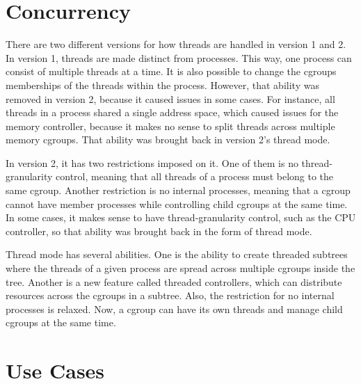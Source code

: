\documentclass[12pt, dvipsnames, a4paper]{article}
\begin{document}
\section{Concurrency}
There are two different versions for how threads are handled in version 1 and 2. In version 1, threads are made distinct from processes. This way, one process can consist of multiple threads at a time. It is also possible to change the cgroups memberships of the threads within the process. However, that ability was removed in version 2, because it caused issues in some cases. For instance, all threads in a process shared a single address space, which caused issues for the memory controller, because it makes no sense to split threads across multiple memory cgroups. That ability was brought back in version 2's thread mode.

In version 2, it has two restrictions imposed on it. One of them is no thread-granularity control, meaning that all threads of a process must belong to the same cgroup. Another restriction is no internal processes, meaning that a cgroup cannot have member processes while controlling child cgroups at the same time. In some cases, it makes sense to have thread-granularity control, such as the CPU controller, so that ability was brought back in the form of thread mode.

Thread mode has several abilities. One is the ability to create threaded subtrees where the threads of a given process are spread across multiple cgroups inside the tree. Another is a new feature called threaded controllers, which can distribute resources across the cgroups in a subtree. Also, the restriction for no internal processes is relaxed. Now, a cgroup can have its own threads and manage child cgroups at the same time.
\clearpage

\section{Use Cases}
\end{document}
